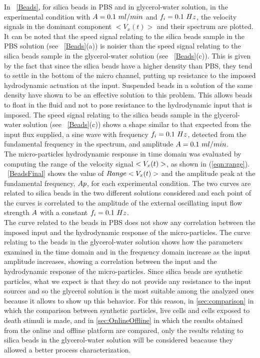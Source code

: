 \documentclass[journal]{IEEEtran}
\theoremstyle{definition}
\theoremstyle{remark}
\begin{document}
In ~\fig\ref{Beads}, for silica beads in PBS and in glycerol-water solution, in the experimental condition with $A=0.1~ml/min$ and  $f_i=0.1~Hz$, the velocity signals in the dominant component  $<V_x(t)>$ and their spectrum are plotted.
It can be noted that the speed signal relating to the silica beads sample in the PBS solution (see ~\fig\ref{Beads}(a)) is noisier than the speed signal relating to the silica beads sample in the glycerol-water solution (see ~\fig\ref{Beads}(c)). This is given by the fact that since the silica beads have a higher density than PBS, they tend to settle in the bottom of the micro channel, putting up resistance to the imposed hydrodynamic actuation at the input. Suspended beads in a solution of the same density have shown to be an effective solution to this problem. This allows beads to float in the fluid and not to pose resistance to the hydrodynamic input that is imposed. The speed signal relating to the silica beads sample in the glycerol-water solution (see ~\fig\ref{Beads}(c)) shows a shape similar to that expected from the input flux supplied, a sine wave with frequency $f_i=0.1~Hz$, detected from the fundamental frequency in the spectrum, and amplitude $A=0.1~ml/min$.
\\The micro-particles hydrodynamic response in time domain was evaluated by computing the range of the velocity signal $<V_{x}(t)>$, as shown in \eqn (\ref{eqn:range}). ~\fig\ref{BeadsFinal} shows the value of $Range<V_x(t)>$ and the amplitude peak at the fundamental frequency, $Ap$, for each experimental condition. The two curves are related to silica beads in the two different solutions considered and each point of the curves is correlated to the amplitude of the external oscillating input flow strength $A$ with a constant $f_i=0.1~Hz$. 
\\The curve related to the beads in PBS does not show any correlation between the imposed input and the hydrodynamic response of the micro-particles. The curve relating to the beads in the glycerol-water solution shows how the parameters examined in the time domain and in the frequency domain increase as the input amplitude increases, showing a correlation between the input and the hydrodynamic response of the micro-particles.
Since silica beads are synthetic particles, what we expect is that they do not provide any resistance to the input sources and so the glycerol solution is the most suitable among the analyzed ones because it allows to show up this behavior.
For this reason, in \sect\ref{sec:comparison} in which the comparison between synthetic particles, live cells and cells exposed to death stimuli is made, and in \sect\ref{sec:OnlineOffline} in which the results obtained from the online and offline platform are compared, only the results relating to silica beads in the glycerol-water solution will be considered beacause they allowed a better process characterization.
\end{document}
